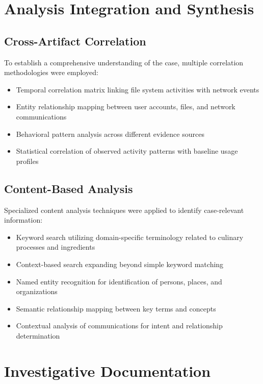 \section{Analysis Integration and Synthesis}

\subsection{Cross-Artifact Correlation}
To establish a comprehensive understanding of the case, multiple correlation methodologies were employed:
\begin{itemize}
    \item Temporal correlation matrix linking file system activities with network events
    \item Entity relationship mapping between user accounts, files, and network communications
    \item Behavioral pattern analysis across different evidence sources
    \item Statistical correlation of observed activity patterns with baseline usage profiles
\end{itemize}

\subsection{Content-Based Analysis}
Specialized content analysis techniques were applied to identify case-relevant information:
\begin{itemize}
    \item Keyword search utilizing domain-specific terminology related to culinary processes and ingredients
    \item Context-based search expanding beyond simple keyword matching
    \item Named entity recognition for identification of persons, places, and organizations
    \item Semantic relationship mapping between key terms and concepts
    \item Contextual analysis of communications for intent and relationship determination
\end{itemize}

\section{Investigative Documentation}


